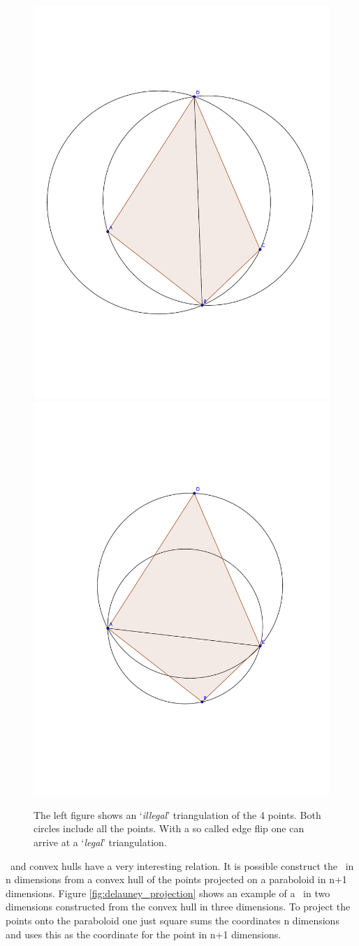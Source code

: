 \begin{figure}[tb] %
   \centering
   \includegraphics[width=.45\textwidth]{chapter_ndinterp/plots/illegal_triangulation.pdf} 
   \includegraphics[width=.45\textwidth]{chapter_ndinterp/plots/edge_flip.pdf} 
   \caption[Change from a `illegal' triangulation to a \deltri]{The left figure shows an `\textit{illegal}' triangulation of the 4 points. Both circles include all the points. With a so called edge flip one can arrive at a `\textit{legal}' triangulation.}
   \label{fig:delauney_allowed}
\end{figure}
\deltri\ and convex hulls have a very interesting relation. It is possible construct the \deltri\ in n dimensions from a convex hull of the points projected on a paraboloid in n+1 dimensions.
Figure \ref{fig:delauney_projection} shows an example of a \deltri\ in two dimensions constructed from the convex hull in three dimensions. To project the points onto the paraboloid one just square sums the coordinates n dimensions and uses this as the coordinate for the point in n+1 dimensions. 

